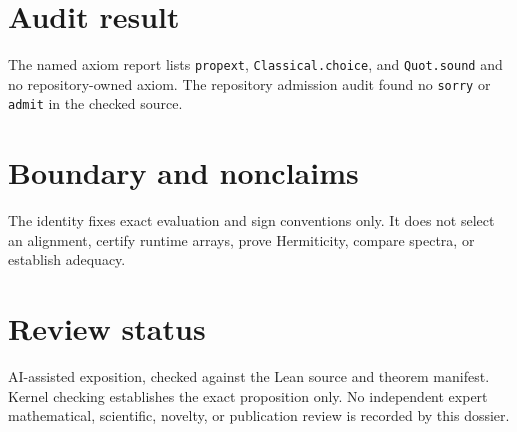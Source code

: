 \documentclass[11pt]{article}
\begin{document}
\section{Audit result}
The named axiom report lists \texttt{propext}, \texttt{Classical.choice}, and
\texttt{Quot.sound} and no repository-owned axiom. The repository admission audit found no
\texttt{sorry} or \texttt{admit} in the checked source.

\section{Boundary and nonclaims}
The identity fixes exact evaluation and sign conventions only. It does not select an alignment,
certify runtime arrays, prove Hermiticity, compare spectra, or establish adequacy.

\section{Review status}
AI-assisted exposition, checked against the Lean source and theorem manifest. Kernel checking
establishes the exact proposition only. No independent expert mathematical, scientific,
novelty, or publication review is recorded by this dossier.
\end{document}

